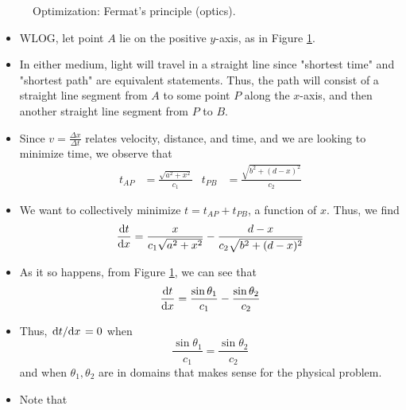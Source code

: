 \documentclass[../main.tex]{subfiles}
\begin{document}
\begin{itemize}
\begin{figure}[h!]
        \caption{Optimization: Fermat's principle (optics).}
        \label{fig:bendinglight}
    \end{figure}
    \begin{itemize}
        \item WLOG, let point $A$ lie on the positive $y$-axis, as in Figure \ref{fig:bendinglight}.
        \item In either medium, light will travel in a straight line since "shortest time" and "shortest path" are equivalent statements. Thus, the path will consist of a straight line segment from $A$ to some point $P$ along the $x$-axis, and then another straight line segment from $P$ to $B$.
        \item Since $v=\frac{\Delta x}{\Delta t}$ relates velocity, distance, and time, and we are looking to minimize time, we observe that
        \begin{align*}
            t_{AP} &= \frac{\sqrt{a^2+x^2}}{c_1}&
            t_{PB} &= \frac{\sqrt{b^2+(d-x)^2}}{c_2}
        \end{align*}
        \item We want to collectively minimize $t=t_{AP}+t_{PB}$, a function of $x$. Thus, we find
        \begin{equation*}
            \dv{t}{x} = \frac{x}{c_1\sqrt{a^2+x^2}}-\frac{d-x}{c_2\sqrt{b^2+(d-x)^2}}
        \end{equation*}
        \item As it so happens, from Figure \ref{fig:bendinglight}, we can see that
        \begin{equation*}
            \dv{t}{x} = \frac{\sin\theta_1}{c_1}-\frac{\sin\theta_2}{c_2}
        \end{equation*}
        \item Thus, $\dv*{t}{x}=0$ when
        \begin{equation*}
            \frac{\sin\theta_1}{c_1} = \frac{\sin\theta_2}{c_2}
        \end{equation*}
        and when $\theta_1,\theta_2$ are in domains that makes sense for the physical problem.
        \item Note that 

\end{itemize}
\end{itemize}
\end{document}

